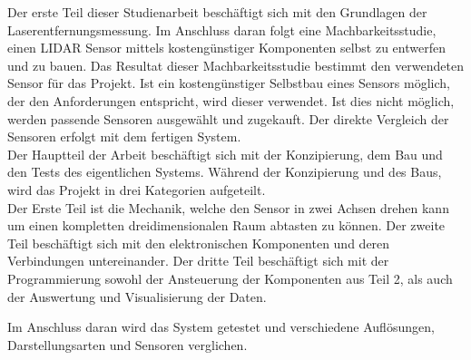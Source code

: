 Der erste Teil dieser Studienarbeit beschäftigt sich mit den Grundlagen der Laserentfernungsmessung. Im Anschluss daran folgt eine Machbarkeitsstudie, einen \ac{LIDAR} Sensor mittels kostengünstiger Komponenten selbst zu entwerfen und zu bauen. Das Resultat dieser Machbarkeitsstudie bestimmt den verwendeten Sensor für das Projekt. Ist ein kostengünstiger Selbstbau eines Sensors möglich, der den Anforderungen entspricht, wird dieser verwendet. Ist dies nicht möglich, werden passende Sensoren ausgewählt und zugekauft. Der direkte Vergleich der Sensoren erfolgt mit dem fertigen System.\\
Der Hauptteil der Arbeit beschäftigt sich mit der Konzipierung, dem Bau und den Tests des eigentlichen Systems. Während der Konzipierung und des Baus, wird das Projekt in drei Kategorien aufgeteilt.\\
Der Erste Teil ist die Mechanik, welche den Sensor in zwei Achsen drehen kann um einen kompletten dreidimensionalen Raum abtasten zu können. Der zweite Teil beschäftigt sich mit den elektronischen Komponenten und deren Verbindungen untereinander. Der dritte Teil beschäftigt sich mit der Programmierung sowohl der Ansteuerung der Komponenten aus Teil 2, als auch der Auswertung und Visualisierung der Daten.

Im Anschluss daran wird das System getestet und verschiedene Auflösungen, Darstellungsarten und Sensoren verglichen.
